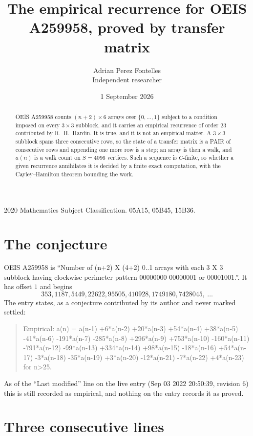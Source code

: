 \documentclass[11pt,a4paper]{article}
\title{The empirical recurrence for OEIS A259958, proved by transfer matrix}
\author{Adrian Perez Fontelles\\ \small Independent researcher}
\date{1 September 2026}
\theoremstyle{plain}
\theoremstyle{definition}
\begin{document}
\maketitle

\begin{abstract}
OEIS A259958 counts $(n+2)\times6$ arrays over $\{0,\dots,1\}$ subject to a condition imposed on
every $3\times3$ subblock, and it carries an empirical recurrence of order $23$
contributed by R.~H.~Hardin. It is true, and it is not an empirical matter. A $3\times3$
subblock spans three consecutive rows, so the state of a transfer matrix is a PAIR of
consecutive rows and appending one more row is a step; an array is then a walk, and
$a(n)$ is a walk count on $S=4096$ vertices. Such a sequence is $C$-finite, so whether a given
recurrence annihilates it is decided by a finite exact computation, with the Cayley--Hamilton
theorem bounding the work.
\end{abstract}

\noindent\small 2020 Mathematics Subject Classification. 05A15, 05B45, 15B36.\normalsize

\section{The conjecture}

OEIS A259958 is ``Number of (n+2) X (4+2) 0..1 arrays with each 3 X 3 subblock having clockwise perimeter pattern 00000000 00000001 or 00001001.''. It has offset $1$ and begins
\[
353, 1187, 5449, 22622, 95505, 410928, 1749180, 7428045,\ \dots
\]
The entry states, as a conjecture contributed by its author and never marked settled:
\begin{quote}
Empirical: a(n) = a(n-1) +6*a(n-2) +20*a(n-3) +54*a(n-4) +38*a(n-5) -41*a(n-6) -191*a(n-7) -285*a(n-8) +296*a(n-9) +753*a(n-10) -160*a(n-11) -791*a(n-12) -99*a(n-13) +334*a(n-14) +98*a(n-15) -18*a(n-16) +54*a(n-17) -3*a(n-18) -35*a(n-19) +3*a(n-20) -12*a(n-21) -7*a(n-22) +4*a(n-23) for n>25.
\end{quote}
As of the ``Last modified'' line on the live entry (Sep 03 2022 20:50:39, revision 6) this is still
recorded as empirical, and nothing on the entry records it as proved.

\section{Three consecutive lines}
\end{document}
